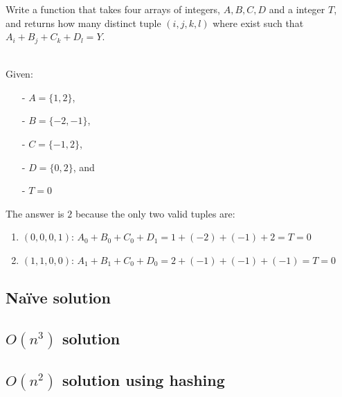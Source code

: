 \begin{exercise}
Write a function that takes four arrays of integers, $A,B,C,D$ and a integer $T$,
and returns how many distinct tuple $(i,j,k,l)$ where exist such that 
$A_i+B_j+C_k+D_l = Y$.

\begin{example}
\hfill \\
Given:
	\begin{itemize}
		\item[-] 	$A=\{1,2\}$,
		\item[-] 	$B=\{-2,-1\}$,
		\item[-] 	$C=\{-1,2\}$,
		\item[-]	$D=\{0,2\}$, and 
		\item[-] 	$T = 0$
	\end{itemize}
The answer is $2$ because the only two valid tuples are:
\begin{enumerate}
	\item $(0,0,0,1)$: $A_0 + B_0 + C_0 + D_1 = 1 + (-2) + (-1) + 2 = T = 0$
	\item $(1,1,0,0)$: $A_1 + B_1 + C_0 + D_0 = 2 + (-1) + (-1) + (-1) = T = 0$
\end{enumerate}
\end{example}

\subsection{Na\"ive solution}

\subsection{$O(n^3)$ solution}

\subsection{$O(n^2)$ solution using hashing}

\end{exercise}	

